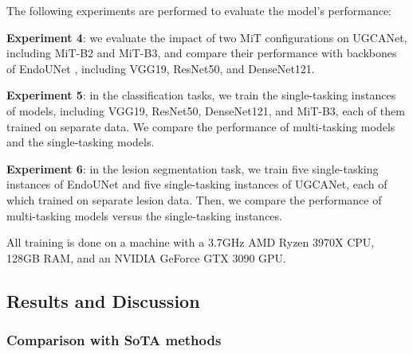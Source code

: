 \documentclass{article}
\begin{document}
\begin{itemize}
The following experiments are performed to evaluate the model's performance:

    \textbf{Experiment 4}: we evaluate the impact of two MiT configurations on UGCANet, including MiT-B2 and MiT-B3, and compare their performance with backbones of EndoUNet \cite{manh2022endounet}, including VGG19, ResNet50, and DenseNet121.
    
    \textbf{Experiment 5}: in the classification tasks, we train the single-tasking instances of models, including VGG19, ResNet50, DenseNet121, and MiT-B3, each of them trained on separate data. We compare the performance of multi-tasking models and the single-tasking models.
    
    \textbf{Experiment 6}: in the lesion segmentation task, we train five single-tasking instances of EndoUNet and five single-tasking instances of UGCANet, each of which trained on separate lesion data. Then, we compare the performance of multi-tasking models versus the single-tasking instances.
\end{itemize}

All training is done on a machine with a 3.7GHz AMD Ryzen 3970X CPU, 128GB RAM, and an NVIDIA GeForce GTX 3090 GPU.


\subsection{Results and Discussion}

\subsubsection{Comparison with SoTA methods}
\end{document}
